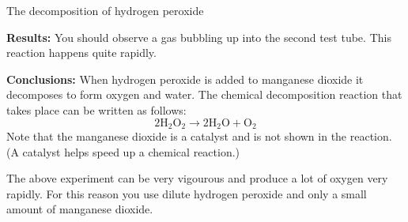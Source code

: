 \begin{g_experiment}{The decomposition of hydrogen peroxide}
\begin{enumerate}[noitemsep, label=\textbf{\arabic*}. ]
\end{enumerate}
        \par 
        \label{m38709*id63254}\noindent{}\textbf{Results:}\newline
    You should observe a gas bubbling up into the second test tube. This reaction happens quite rapidly. \par 
        \label{m38709*id63302}\noindent{}\textbf{Conclusions:}\newline
    When hydrogen peroxide is added to manganese dioxide it decomposes to form oxygen and water. The chemical decomposition reaction that takes place can be written as follows:
        \label{m38709*id63313}\nopagebreak\noindent{}
    \begin{equation}
    2{\mathrm{H}}_{2}{\mathrm{O}}_{2}\to 2\mathrm{H}{}_{2}\mathrm{O}+{\mathrm{O}}_{2}\tag{12.3}
      \end{equation}
Note that the manganese dioxide is a catalyst and is not shown in the reaction. (A catalyst helps speed up a chemical reaction.)    \par 
\end{g_experiment}
\label{m38709*eip-619}
	\par
      \label{m38709*eip-633}The above experiment can be very vigourous and produce a lot of oxygen very rapidly. For this reason you use dilute hydrogen peroxide and only a small amount of manganese dioxide. \par 
      \label{m38709*uid17}
